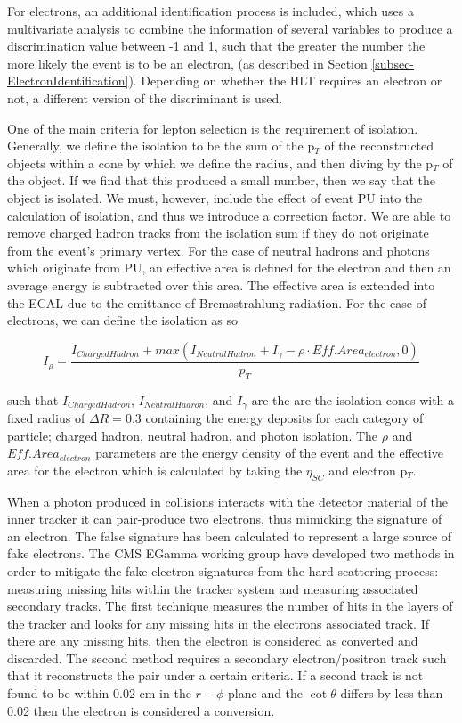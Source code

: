 For electrons, an additional identification process is included, which uses a multivariate analysis to combine the information of several variables to produce a discrimination value between -1 and 1, such that the greater the number the more likely the event is to be an electron, (as described in Section \ref{subsec-ElectronIdentification}). Depending on whether the HLT requires an electron or not, a different version of the discriminant is used. 

One of the main criteria for lepton selection is the requirement of isolation. Generally, we define the isolation to be the sum of the p$_T$ of the reconstructed objects within a cone by which we define the radius, and then diving by the p$_T$ of the object. If we find that this produced a small number, then we say that the object is isolated. We must, however, include the effect of event PU into the calculation of isolation, and thus we introduce a correction factor. We are able to remove charged hadron tracks from the isolation sum if they do not originate from the event's primary vertex. For the case of neutral hadrons and photons which originate from PU, an effective area is defined for the electron and then an average energy is subtracted over this area. The effective area is extended into the ECAL due to the emittance of Bremsstrahlung radiation. For the case of electrons, we can define the isolation as so

\begin{equation} \label{eq-RelativeIsolation}
I_{\rho} = \frac{I_{ChargedHadron}+max\left(I_{NeutralHadron} + I_{\gamma} - \rho \cdot Eff.Area_{electron}, 0 \right)}{p_T}
\end{equation}

such that $I_{ChargedHadron}$, $I_{NeutralHadron}$, and $I_{\gamma}$ are the are the isolation cones with a fixed radius of $\Delta R = 0.3$ containing the energy deposits for each category of particle; charged hadron, neutral hadron, and photon isolation. The $\rho$ and $Eff.Area_{electron}$ parameters are the energy density of the event and the effective area for the electron which is calculated by taking the $\eta_{SC}$ and electron p$_T$. 

When a photon produced in collisions interacts with the detector material of the inner tracker it can pair-produce two electrons, thus mimicking the signature of an electron. The false signature has been calculated to represent a large source of fake electrons. The CMS EGamma working group have developed two methods in order to mitigate the fake electron signatures from the hard scattering process: measuring missing hits within the tracker system and measuring associated secondary tracks. The first technique measures the number of hits in the layers of the tracker and looks for any missing hits in the electrons associated track. If there are any missing hits, then the electron is considered as converted and discarded. The second method requires a secondary electron/positron track such that it reconstructs the pair under a certain criteria. If a second track is not found to be within 0.02 cm in the $r - \phi$ plane and the $\cot\theta$ differs by less than 0.02 then the electron is considered a conversion. 

